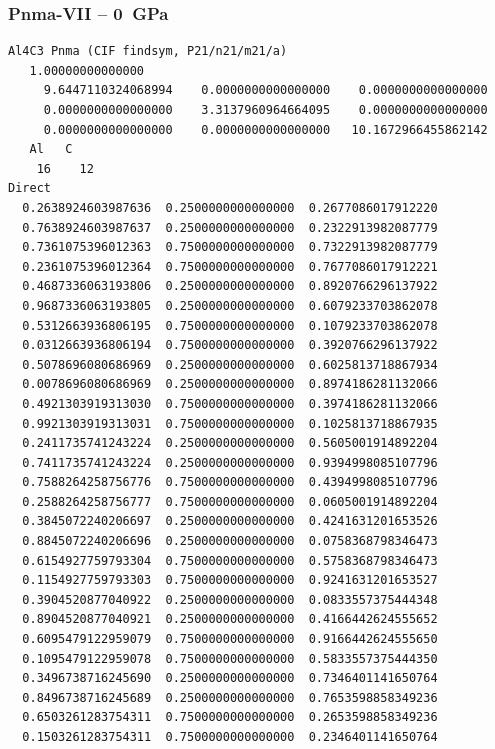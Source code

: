 \subsubsection*{Pnma-VII -- 0~GPa}
\begin{footnotesize}
\begin{verbatim}
Al4C3 Pnma (CIF findsym, P21/n21/m21/a) 
   1.00000000000000     
     9.6447110324068994    0.0000000000000000    0.0000000000000000
     0.0000000000000000    3.3137960964664095    0.0000000000000000
     0.0000000000000000    0.0000000000000000   10.1672966455862142
   Al   C 
    16    12
Direct
  0.2638924603987636  0.2500000000000000  0.2677086017912220
  0.7638924603987637  0.2500000000000000  0.2322913982087779
  0.7361075396012363  0.7500000000000000  0.7322913982087779
  0.2361075396012364  0.7500000000000000  0.7677086017912221
  0.4687336063193806  0.2500000000000000  0.8920766296137922
  0.9687336063193805  0.2500000000000000  0.6079233703862078
  0.5312663936806195  0.7500000000000000  0.1079233703862078
  0.0312663936806194  0.7500000000000000  0.3920766296137922
  0.5078696080686969  0.2500000000000000  0.6025813718867934
  0.0078696080686969  0.2500000000000000  0.8974186281132066
  0.4921303919313030  0.7500000000000000  0.3974186281132066
  0.9921303919313031  0.7500000000000000  0.1025813718867935
  0.2411735741243224  0.2500000000000000  0.5605001914892204
  0.7411735741243224  0.2500000000000000  0.9394998085107796
  0.7588264258756776  0.7500000000000000  0.4394998085107796
  0.2588264258756777  0.7500000000000000  0.0605001914892204
  0.3845072240206697  0.2500000000000000  0.4241631201653526
  0.8845072240206696  0.2500000000000000  0.0758368798346473
  0.6154927759793304  0.7500000000000000  0.5758368798346473
  0.1154927759793303  0.7500000000000000  0.9241631201653527
  0.3904520877040922  0.2500000000000000  0.0833557375444348
  0.8904520877040921  0.2500000000000000  0.4166442624555652
  0.6095479122959079  0.7500000000000000  0.9166442624555650
  0.1095479122959078  0.7500000000000000  0.5833557375444350
  0.3496738716245690  0.2500000000000000  0.7346401141650764
  0.8496738716245689  0.2500000000000000  0.7653598858349236
  0.6503261283754311  0.7500000000000000  0.2653598858349236
  0.1503261283754311  0.7500000000000000  0.2346401141650764
 

\end{verbatim}
\end{footnotesize}
